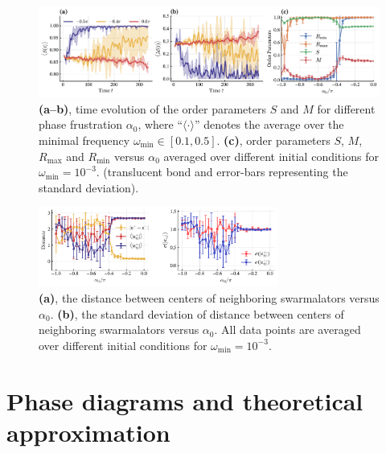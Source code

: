 \documentclass{article}
\begin{document}
\begin{figure}
    \includegraphics[width=\textwidth]{./figs/orderParameters.pdf}
    \caption{
        \label{fig:orderParameters} 
        \textbf{(a--b)}, time evolution of the order parameters $S$ and $M$ for different phase frustration $\alpha_0$, where \enquote{$\langle\cdot\rangle$} denotes the average over the minimal frequency $\omega_{\min}\in\left[0.1, 0.5\right]$.
        \textbf{(c)}, order parameters $S$, $M$, $R_{\max}$ and $R_{\min}$ versus $\alpha_0$ averaged over different initial conditions for $\omega_{\min}=10^{-3}$.
        (translucent bond and error-bars representing the standard deviation).
    }
\end{figure}

\begin{figure}
    \includegraphics[width=0.7\textwidth]{./figs/distancesVsAlpha.pdf}
    \caption{
        \label{fig:distancesVsAlpha} 
        \textbf{(a)}, the distance between centers of neighboring swarmalators versus $\alpha_0$.
        \textbf{(b)}, the standard deviation of distance between centers of neighboring swarmalators versus $\alpha_0$.
        All data points are averaged over different initial conditions for $\omega_{\min}=10^{-3}$.
    }
\end{figure}

\section{\label{sec:} Phase diagrams and theoretical approximation}
\end{document}
